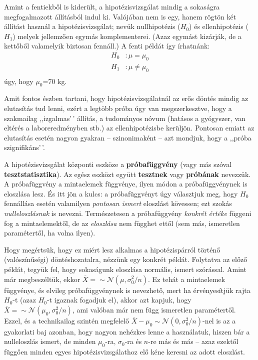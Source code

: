 \documentclass[
]{book}
\begin{document}
Amint a fentiekből is kiderült, a hipotézisvizsgálat mindig a sokaságra megfogalmazott állításból indul ki. Valójában nem is egy, hanem rögtön két állítást használ a hipotézisvizsgálat; nevük nullhipotézis (\(H_0\)) és ellenhipotézis (\(H_1\)) melyek jellemzően egymás komplementerei. (Azaz egymást kizárják, de a kettőből valamelyik biztosan fennáll.) A fenti példát így írhatnánk:
\begin{align*}
    H_0&: \mu = \mu_0\\
    H_1&: \mu \neq \mu_0\\
\end{align*}
úgy, hogy \(\mu_0\)=70 kg.

Amit fontos észben tartani, hogy hipotézisvizsgálatnál az erős döntés mindig az elutasítás tud lenni, ezért a legtöbb próba úgy van megszerkesztve, hogy a szakmailag ,,izgalmas'\,' állítás, a tudományos nóvum (hatásos a gyógyszer, van eltérés a laboreredményben stb.) az ellenhipotézisbe kerüljön. Pontosan emiatt az elutasítás esetén nagyon gyakran -- szinonimaként -- azt mondjuk, hogy a ,,próba szignifikáns'\,'.

A hipotézisvizsgálat központi eszköze a \textbf{próbafüggvény} (vagy más szóval \textbf{tesztstatisztika}). Az egész eszközt együtt \textbf{tesztnek} vagy \textbf{próbának} nevezzük. A próbafüggvény a mintaelemek függvénye, ilyen módon a próbafüggvénynek is eloszlása lesz. És itt jön a kulcs: a próbafüggvényt úgy választjuk meg, hogy \(H_0\) fennállása esetén valamilyen \emph{pontosan ismert} eloszlást kövessen; ezt szokás \emph{nulleloszlásnak} is nevezni. Természetesen a próbafüggvény \emph{konkrét értéke} függeni fog a mintaelemektől, de az \emph{eloszlása} nem függhet ettől (sem más, ismeretlen paramétertől, ha volna ilyen).

Hogy megértsük, hogy ez miért lesz alkalmas a hipotézispárról történő (valószínűségi) döntéshozatalra, nézzünk egy konkrét példát. Folytatva az előző példát, tegyük fel, hogy sokaságunk eloszlása normális, ismert szórással. Amint már megbeszéltük, ekkor \(\overline{X}= \sim \mathcal{N}\left(\mu,\sigma_0^2/n\right)\). Ez tehát a mintaelemek függvénye, és elvileg próbafüggvénynek is nevezhető, mert ha érvényesítjük rajta \(H_0\)-t (azaz \(H_0\)-t igaznak fogadjuk el), akkor azt kapjuk, hogy \(\overline{X}= \sim \mathcal{N}\left(\mu_0,\sigma_0^2/n\right)\), ami valóban már nem függ ismeretlen paramétertől. Ezzel, és a technikailag szintén megfelelő \(\overline{X}-\mu_0\sim \mathcal{N}\left(0,\sigma_0^2/n\right)\)-nel is az a gyakorlati baj azonban, hogy nagyon nehézkes lenne a használatuk, hiszen bár a nulleloszlás ismert, de minden \(\mu_0\)-ra, \(\sigma_0\)-ra és \(n\)-re más és más -- azaz ezektől függően minden egyes hipotézisvizsgálathoz elő kéne keresni az adott eloszlást.
\end{document}
